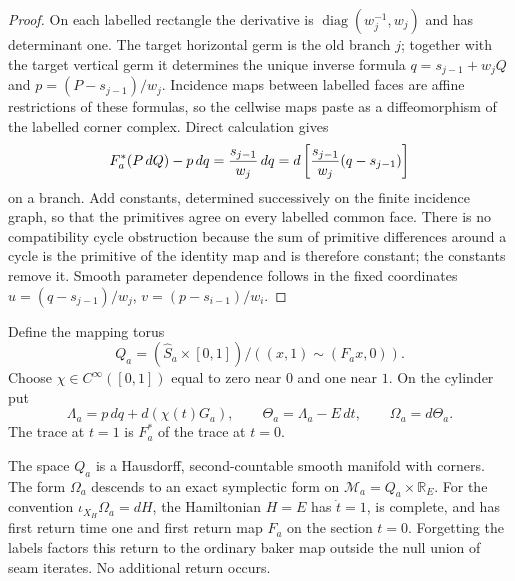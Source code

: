 \begin{proof}
On each labelled rectangle the derivative is
$\operatorname{diag}(w_j^{-1},w_j)$ and has determinant one.  The target
horizontal germ is the old branch $j$; together with the target vertical germ
it determines the unique inverse formula
$q=s_{j-1}+w_jQ$ and $p=(P-s_{j-1})/w_j$.  Incidence maps between labelled
faces are affine restrictions of these formulas, so the cellwise maps paste
as a diffeomorphism of the labelled corner complex.  Direct calculation gives
\[
 F_a^*(P\,dQ)-p\,dq={s_{j-1}\over w_j}\,dq
 =d\left[{s_{j-1}\over w_j}(q-s_{j-1})\right]
\]
on a branch.  Add constants, determined successively on the finite incidence
graph, so that the primitives agree on every labelled common face.  There is
no compatibility cycle obstruction because the sum of primitive differences
around a cycle is the primitive of the identity map and is therefore
constant; the constants remove it.  Smooth parameter dependence follows in
the fixed coordinates
$u=(q-s_{j-1})/w_j$, $v=(p-s_{i-1})/w_i$.
\end{proof}

Define the mapping torus
\[
 Q_a=(\widehat S_a\times[0,1])/
       ((x,1)\sim(F_a x,0)).
\]
Choose $\chi\in C^\infty([0,1])$ equal to zero near $0$ and one near $1$.
On the cylinder put
\[
 \Lambda_a=p\,dq+d(\chi(t)G_a),
 \qquad
 \Theta_a=\Lambda_a-E\,dt,
 \qquad
 \Omega_a=d\Theta_a.
\]
The trace at $t=1$ is $F_a^*$ of the trace at $t=0$.

\begin{theorem}
\label{thm:r21-a1-suspension}
The space $Q_a$ is a Hausdorff, second-countable smooth manifold with corners.
The form $\Omega_a$ descends to an exact symplectic form on
$\mathcal M_a=Q_a\times\mathbb R_E$.  For the convention
$\iota_{X_H}\Omega_a=dH$, the Hamiltonian $H=E$ has $\dot t=1$, is complete,
and has first return time one and first return map $F_a$ on the section
$t=0$.  Forgetting the labels factors this return to the ordinary baker map
outside the null union of seam iterates.  No additional return occurs.
\end{theorem}

